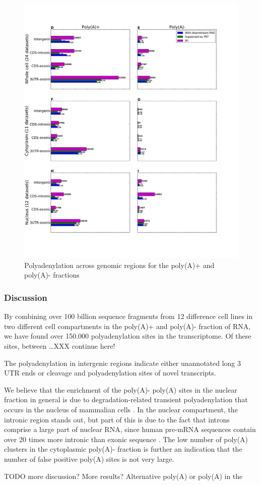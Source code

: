 \begin{figure}[htb]
	\begin{center}
		\includegraphics[scale=0.4]{figures/polyadenylation/Sidebars_pA_2+.pdf}
	\end{center}
	\caption{Polyadenylation across genomic regions for the poly(A)+ and poly(A)-
	fractions}
	\label{fig:sidebars}
\end{figure}

\subsubsection{Discussion}
By combining over 100 billion sequence fragments from 12 difference cell lines
in two different cell compartments in the poly(A)+ and poly(A)- fraction of
RNA, we have found over 150.000 polyadenylation sites in the transcriptome. Of
these sites, between \ldots XXX continue here!

The polyadenylation in intergenic regions indicate either unannotated long 3\p
UTR ends or cleavage and polyadenylation sites of novel transcripts.

We believe that the enrichment of the poly(A)- poly(A) sites in the nuclear
fraction in general is due to degradation-related transient polyadenylation
that occurs in the nucleus of mammalian cells \cite{lemay_nuclear_2010,
lacava_rna_2005, wyers_cryptic_2005}. In the nuclear compartment, the intronic
region stands out, but part of this is due to the fact that introns comprise a
large part of nuclear RNA, since human pre-mRNA sequences contain over 20 times
more intronic than exonic sequence \cite{venter_sequence_2001}. The low number
of poly(A) clusters in the cytoplasmic poly(A)- fraction is further an
indication that the number of false positive poly(A) sites is not very large.

TODO more discussion? More results? Alternative poly(A) or poly(A) in the
